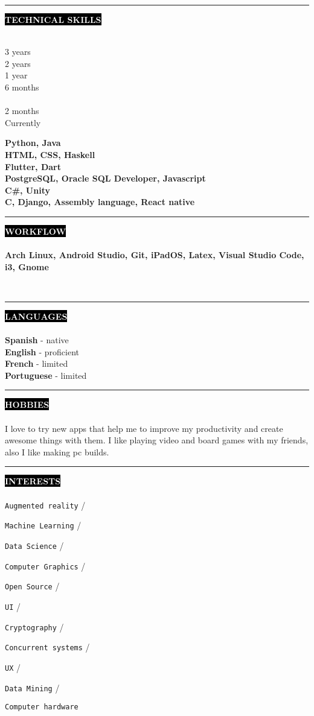 \documentclass[10pt,A4]{article}
\newcounter{a}
\newcounter{b}
\newcounter{c}
\newcommand{\cvsection}[1] {
	\textcolor{white}{\MakeUppercase{\textbf{#1}}}
}
\newcommand{\cvsect}[1]{
	\colorbox{black}{{\cvsection{#1}}}\\\\%
}
\newcommand{\slashsep}{
	\hspace{2mm}/\hspace{2mm}
}
\begin{document}
	

	\begin{minipage}[t]{0.5\textwidth}\hrule height 0pt width 0pt%
	\cvsect{Technical Skills}
	\begin{minipage}[t]{0.3\textwidth}%
		3 years\\ 2 years \\ 1 year \\ 6 months \\ \\ 2 months \\ Currently
	\end{minipage}%
	\begin{minipage}[t]{0.7\textwidth}%
		\textbf{Python, Java}\\ \textbf{HTML, CSS, Haskell} \\ \textbf{Flutter, Dart} \\ \textbf{PostgreSQL, Oracle SQL Developer, Javascript} \\ \textbf{C\#, Unity} \\ \textbf{C, Django, Assembly language, React native}
	\end{minipage}%
	\end{minipage}%
	\hspace{1cm}
	\begin{minipage}[t]{0.45\textwidth}\hrule height 0pt width 0pt%
		\cvsect{Workflow}
		\textbf{Arch Linux, Android Studio, Git, iPadOS, Latex, Visual Studio Code, i3, Gnome}
	\end{minipage}%
	\hspace{2cm}
	\\
	



	
	\begin{minipage}[t]{0.3\textwidth}\hrule height 0pt width 0pt%
		\cvsect{Languages}
		\textbf{Spanish} - native\\
		\textbf{English} - proficient\\
		\textbf{French} - limited\\
		\textbf{Portuguese} - limited\\
	\end{minipage}%
	\hspace{0cm}
	\begin{minipage}[t]{0.3\textwidth}\hrule height 0pt width 0pt%
		\cvsect{Hobbies}
		I love to try new apps that help me to improve my productivity and create awesome things with them. 
		I like playing video and board games with my friends, also I like making pc builds.
	\end{minipage}%
	\hspace{2cm}
	\begin{minipage}[t]{0.3\textwidth}\hrule height 0pt width 0pt%
		\cvsect{Interests}
		\texttt{Augmented reality}\slashsep
		\texttt{Machine Learning}\slashsep
		\texttt{Data Science}\slashsep
		\texttt{Computer Graphics}\slashsep
		\texttt{Open Source}\slashsep
		\texttt{UI}\slashsep
		\texttt{Cryptography}\slashsep
		\texttt{Concurrent systems}\slashsep
		\texttt{UX}\slashsep
		\texttt{Data Mining} \slashsep
		\texttt{Computer hardware}

		
	\end{minipage}%
	
\end{document}
